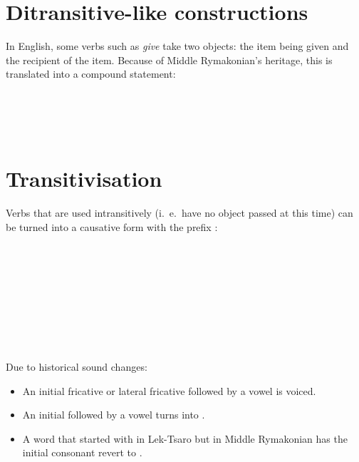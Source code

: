 \documentclass{book}
\newcommand{\lname}{Middle Rymakonian}
\begin{document}
\section{Ditransitive-like constructions}

In English, some verbs such as \emph{give} take two objects: the item being given and the recipient of the item. Because of \lname{}'s heritage, this is translated into a compound statement: \\
~\\
 \\
 \\
     \\
   

\section{Transitivisation}

Verbs that are used intransitively (i.~e.~have no object passed at this time) can be turned into a causative form with the prefix : \\
~\\
 \\
  \\
  \\
~\\
 \\
 \\
   \\
   \\

Due to historical sound changes:

\begin{itemize}
  \item An initial fricative or lateral fricative followed by a vowel is voiced.
  \item An initial  followed by a vowel turns into .
  \item A word that started with  in Lek-Tsaro but  in \lname{} has the initial consonant revert to .
\end{itemize}
\end{document}
